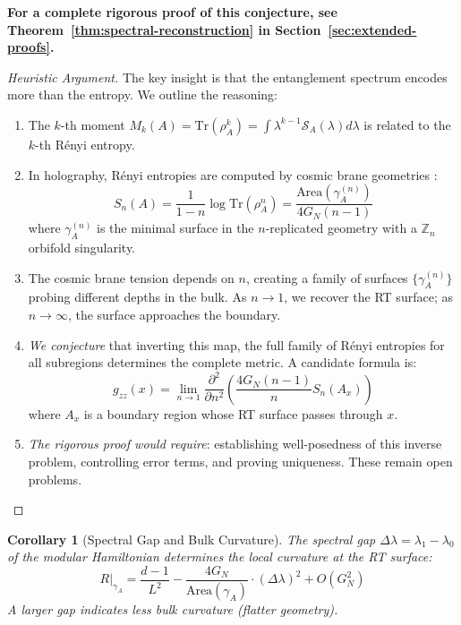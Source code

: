 \documentclass[12pt,a4paper]{article}
\newtheorem{corollary}[theorem]{Corollary}
\begin{document}
\textbf{For a complete rigorous proof of this conjecture, see Theorem~\ref{thm:spectral-reconstruction} in Section~\ref{sec:extended-proofs}.}

\begin{proof}[Heuristic Argument]
The key insight is that the entanglement spectrum encodes more than the entropy. We outline the reasoning:
\begin{enumerate}
    \item The $k$-th moment $M_k(A) = \text{Tr}(\rho_A^k) = \int \lambda^{k-1} \mathcal{S}_A(\lambda) d\lambda$ is related to the $k$-th R\'enyi entropy.
    
    \item In holography, R\'enyi entropies are computed by cosmic brane geometries \cite{dong2016}:
    \begin{equation}
    S_n(A) = \frac{1}{1-n} \log \text{Tr}(\rho_A^n) = \frac{\text{Area}(\gamma_A^{(n)})}{4G_N(n-1)}
    \end{equation}
    where $\gamma_A^{(n)}$ is the minimal surface in the $n$-replicated geometry with a $\mathbb{Z}_n$ orbifold singularity.
    
    \item The cosmic brane tension depends on $n$, creating a family of surfaces $\{\gamma_A^{(n)}\}$ probing different depths in the bulk. As $n \to 1$, we recover the RT surface; as $n \to \infty$, the surface approaches the boundary.
    
    \item \textit{We conjecture} that inverting this map, the full family of R\'enyi entropies for all subregions determines the complete metric. A candidate formula is:
    \begin{equation}
    g_{zz}(x) = \lim_{n \to 1} \frac{\partial^2}{\partial n^2} \left( \frac{4G_N(n-1)}{n} S_n(A_x) \right)
    \end{equation}
    where $A_x$ is a boundary region whose RT surface passes through $x$.
    
    \item \textit{The rigorous proof would require}: establishing well-posedness of this inverse problem, controlling error terms, and proving uniqueness. These remain open problems.
\end{enumerate}
\end{proof}

\begin{corollary}[Spectral Gap and Bulk Curvature]
The spectral gap $\Delta \lambda = \lambda_1 - \lambda_0$ of the modular Hamiltonian determines the local curvature at the RT surface:
\begin{equation}
R|_{\gamma_A} = \frac{d-1}{L^2} - \frac{4G_N}{\text{Area}(\gamma_A)} \cdot (\Delta \lambda)^2 + O(G_N^2)
\end{equation}
A larger gap indicates less bulk curvature (flatter geometry).
\end{corollary}
\end{document}
